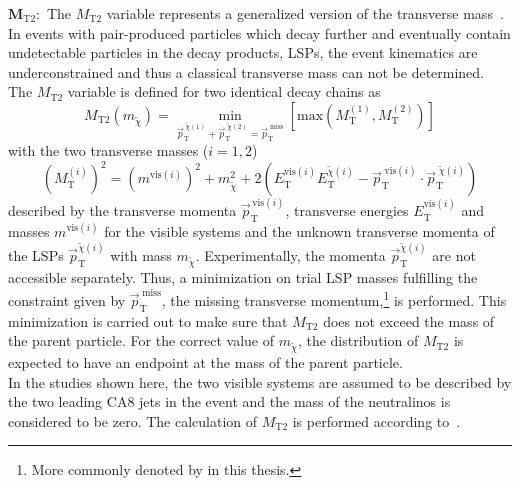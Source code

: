 \begin{description}
 \item $\mathbf{M_\mathrm{T2}:}$ The $M_\mathrm{T2}$ variable represents a generalized version of the transverse mass~\cite{Lester:1999tx, Barr:2003rg, Chatrchyan:2012jx, CMS-PAS-SUS-13-019}. In events with pair-produced particles which decay further and eventually contain undetectable particles in the decay products, \eg LSPs, the event kinematics are underconstrained and thus a classical transverse mass can not be determined. The $M_\mathrm{T2}$ variable is defined for two identical decay chains as
\begin{equation}
 M_\mathrm{T2}(m_{\tilde{\chi}}) = \min_{\vec{p}_\mathrm{T}^{\;\tilde{\chi}(1)} + \vec{p}_\mathrm{T}^{\;\tilde{\chi}(2)} = \vec{p}_\mathrm{T}^{\; \mathrm{miss}}} \left[ \mathrm{max} \left(M_\mathrm{T}^{(1)}, M_\mathrm{T}^{(2)} \right) \right] 
\end{equation} 
with the two transverse masses ($i = 1, 2$)
\begin{equation}
 (M_\mathrm{T}^{(i)})^2 = (m^{\mathrm{vis}(i)})^2 + m_{\tilde{\chi}}^2 + 2 \left( E_\mathrm{T}^{\mathrm{vis}(i)} E_\mathrm{T}^{\tilde{\chi}(i)} - \vec{p}_\mathrm{T}^{\; \mathrm{vis}(i)} \cdot \vec{p}_\mathrm{T}^{\; \tilde{\chi}(i)}   \right) 
\end{equation}
described by the transverse momenta $\vec{p}_\mathrm{T}^{\, \mathrm{vis}(i)}$, transverse energies $E_\mathrm{T}^{\mathrm{vis}(i)}$ and masses $m^{\mathrm{vis}(i)}$ for the visible systems and the unknown transverse momenta of the LSPs $\vec{p}_\mathrm{T}^{\tilde{\chi}(i)}$ with mass $m_{\tilde{\chi}}$. Experimentally, the momenta $\vec{p}_\mathrm{T}^{\tilde{\chi}(i)}$ are not accessible separately. Thus, a minimization on trial LSP masses fulfilling the constraint given by $\vec{p}_\mathrm{T}^{\; \mathrm{miss}}$, the missing transverse momentum,\footnote{More commonly denoted by \metvec in this thesis.} is performed. This minimization is carried out to make sure that $M_\mathrm{T2}$ does not exceed the mass of the parent particle. For the correct value of $m_{\tilde{\chi}}$, the distribution of $M_\mathrm{T2}$ is expected to have an endpoint at the mass of the parent particle. \\
In the studies shown here, the two visible systems are assumed to be described by the two leading CA8 jets in the event and the mass of the neutralinos is considered to be zero. The calculation of $M_\mathrm{T2}$ is performed according to~\cite{Cheng:2008hk}. \\ 

\end{description}
